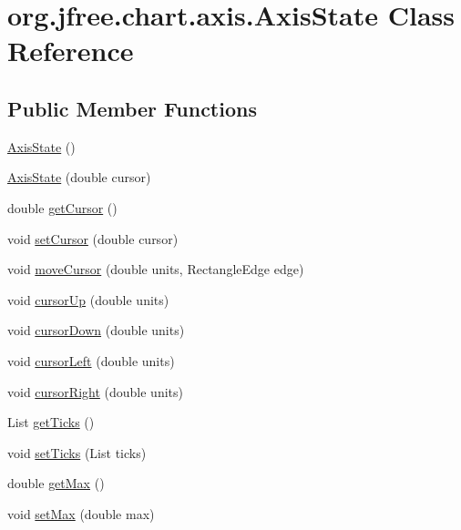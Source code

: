 \hypertarget{classorg_1_1jfree_1_1chart_1_1axis_1_1_axis_state}{}\section{org.\+jfree.\+chart.\+axis.\+Axis\+State Class Reference}
\label{classorg_1_1jfree_1_1chart_1_1axis_1_1_axis_state}
\subsection*{Public Member Functions}
\begin{DoxyCompactItemize}
\item 
\mbox{\hyperlink{classorg_1_1jfree_1_1chart_1_1axis_1_1_axis_state_a6209c8f3a5eb8e3d5f03f82c5fec590d}{Axis\+State}} ()
\item 
\mbox{\hyperlink{classorg_1_1jfree_1_1chart_1_1axis_1_1_axis_state_a58e9c4ba6dd03ebcb78610200d698c7b}{Axis\+State}} (double cursor)
\item 
double \mbox{\hyperlink{classorg_1_1jfree_1_1chart_1_1axis_1_1_axis_state_a9b1c08f289777a1c1a5cd9d19a9f3fe0}{get\+Cursor}} ()
\item 
void \mbox{\hyperlink{classorg_1_1jfree_1_1chart_1_1axis_1_1_axis_state_af1d224e02daffe44cdcff3fd523eae1a}{set\+Cursor}} (double cursor)
\item 
void \mbox{\hyperlink{classorg_1_1jfree_1_1chart_1_1axis_1_1_axis_state_ad387081c8a498a4c9d902583b7b5a78e}{move\+Cursor}} (double units, Rectangle\+Edge edge)
\item 
void \mbox{\hyperlink{classorg_1_1jfree_1_1chart_1_1axis_1_1_axis_state_a5b629c585329fc3aeabffae4c1f37ee7}{cursor\+Up}} (double units)
\item 
void \mbox{\hyperlink{classorg_1_1jfree_1_1chart_1_1axis_1_1_axis_state_a14de2e0448bc1203b659d151ba70d5bc}{cursor\+Down}} (double units)
\item 
void \mbox{\hyperlink{classorg_1_1jfree_1_1chart_1_1axis_1_1_axis_state_a0a9bc509537e54f098fc68837e0321d2}{cursor\+Left}} (double units)
\item 
void \mbox{\hyperlink{classorg_1_1jfree_1_1chart_1_1axis_1_1_axis_state_a3f4fd674f0ad48f77c2e3536c63c0b18}{cursor\+Right}} (double units)
\item 
List \mbox{\hyperlink{classorg_1_1jfree_1_1chart_1_1axis_1_1_axis_state_a9aed4586cd53387cf5cee9f74eff1f9d}{get\+Ticks}} ()
\item 
void \mbox{\hyperlink{classorg_1_1jfree_1_1chart_1_1axis_1_1_axis_state_a54715140c40902a1e95a29f186752d60}{set\+Ticks}} (List ticks)
\item 
double \mbox{\hyperlink{classorg_1_1jfree_1_1chart_1_1axis_1_1_axis_state_a9c28d84a2d9e968a37f570a04b0c4af6}{get\+Max}} ()
\item 
void \mbox{\hyperlink{classorg_1_1jfree_1_1chart_1_1axis_1_1_axis_state_a700c56fd13000708b5d80eb595634235}{set\+Max}} (double max)
\end{DoxyCompactItemize}


